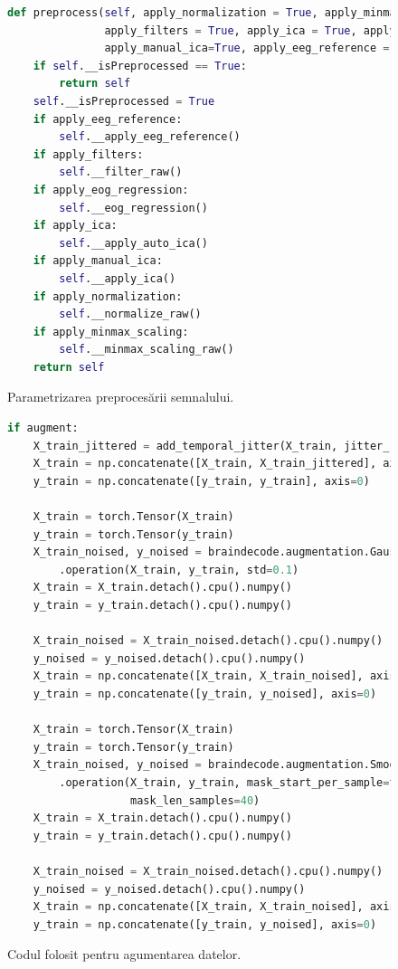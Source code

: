 \begin{figure}
\begin{lstlisting}[language=Python]
def preprocess(self, apply_normalization = True, apply_minmax_scaling=True,
               apply_filters = True, apply_ica = True, apply_eog_regression = True,
               apply_manual_ica=True, apply_eeg_reference = True):
    if self.__isPreprocessed == True:
        return self
    self.__isPreprocessed = True
    if apply_eeg_reference:
        self.__apply_eeg_reference()
    if apply_filters:
        self.__filter_raw()
    if apply_eog_regression:
        self.__eog_regression()
    if apply_ica:
        self.__apply_auto_ica()
    if apply_manual_ica:
        self.__apply_ica()
    if apply_normalization:
        self.__normalize_raw()
    if apply_minmax_scaling:
        self.__minmax_scaling_raw()
    return self
\end{lstlisting}
\caption{Parametrizarea preprocesării semnalului.}
\label{fig:parametrizare}
\end{figure}

\begin{figure}
\begin{lstlisting}[language=Python]
if augment:
    X_train_jittered = add_temporal_jitter(X_train, jitter_range_ms=20, sampling_rate=300)
    X_train = np.concatenate([X_train, X_train_jittered], axis=0)
    y_train = np.concatenate([y_train, y_train], axis=0)

    X_train = torch.Tensor(X_train)
    y_train = torch.Tensor(y_train)
    X_train_noised, y_noised = braindecode.augmentation.GaussianNoise(probability=0.5) \
        .operation(X_train, y_train, std=0.1)
    X_train = X_train.detach().cpu().numpy()
    y_train = y_train.detach().cpu().numpy()

    X_train_noised = X_train_noised.detach().cpu().numpy()
    y_noised = y_noised.detach().cpu().numpy()
    X_train = np.concatenate([X_train, X_train_noised], axis=0)
    y_train = np.concatenate([y_train, y_noised], axis=0)

    X_train = torch.Tensor(X_train)
    y_train = torch.Tensor(y_train)
    X_train_noised, y_noised = braindecode.augmentation.SmoothTimeMask(probability=0.5) \
        .operation(X_train, y_train, mask_start_per_sample=torch.randint(low=0, high=400, size=(X_train.shape[0],)), 
                   mask_len_samples=40)
    X_train = X_train.detach().cpu().numpy()
    y_train = y_train.detach().cpu().numpy()

    X_train_noised = X_train_noised.detach().cpu().numpy()
    y_noised = y_noised.detach().cpu().numpy()
    X_train = np.concatenate([X_train, X_train_noised], axis=0)
    y_train = np.concatenate([y_train, y_noised], axis=0)
\end{lstlisting}
\caption{Codul folosit pentru agumentarea datelor.}
\label{fig:augmentari}
\end{figure}

